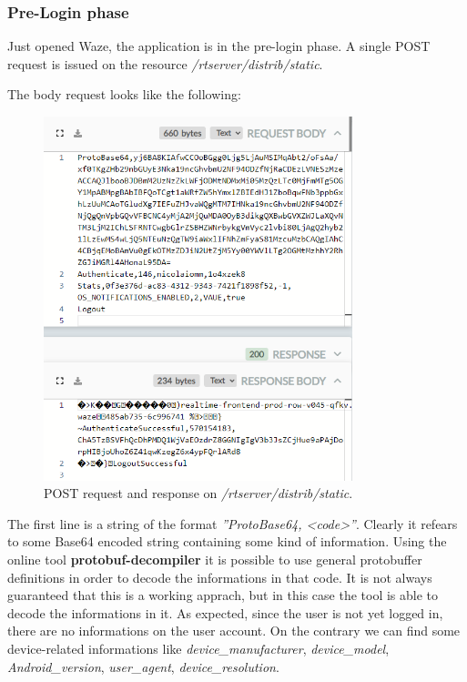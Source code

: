 		\subsubsection{Pre-Login phase}
			\par Just opened Waze, the application is in the pre-login phase. A single POST request is issued on the resource \textit{/rtserver/distrib/static}.\newline
			\par The body request looks like the following:
			\begin{figure}[H]
				\centering
				\includegraphics[width=0.8\textwidth]{images/waze_staticbody.png}
				\caption{POST request and response on \textit{/rtserver/distrib/static}.}
			\end{figure}
			\par The first line is a string of the format \textit{''ProtoBase64, <code>''}. Clearly it refears to some Base64 encoded string containing some kind of information. Using the online tool \textbf{protobuf-decompiler} it is possible to use general protobuffer definitions in order to decode the informations in that code. It is not always guaranteed that this is a working apprach, but in this case the tool is able to decode the informations in it. As expected, since the user is not yet logged in, there are no informations on the user account. On the contrary we can find some device-related informations like \textit{device\_manufacturer}, \textit{device\_model}, \textit{Android\_version}, \textit{user\_agent}, \textit{device\_resolution}.\newline
